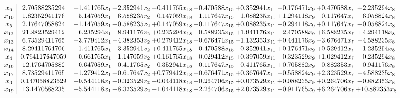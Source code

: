 \documentclass[10pt]{article}
\begin{document}
 \[\begin{array}{c| c c@{\hskip 2pt} c@{\hskip 2pt} c@{\hskip 2pt} c@{\hskip 2pt} c@{\hskip 2pt} c@{\hskip 2pt} c@{\hskip 2pt} c@{\hskip 2pt} }
 x_{6}   &  2.70588235294 & + 1.411765 x_{1} & + 2.352941 x_{2} & -0.411765 x_{18} & -0.470588 x_{15} & + 0.352941 x_{11} & -0.176471 x_{9} & + 0.470588 x_{7} & + 2.235294 x_{8}\\
 x_{10}   &  1.82352941176 & + 5.147059 x_{1} & -6.588235 x_{2} & -0.147059 x_{18} & + 1.117647 x_{15} & -1.088235 x_{11} & + 1.294118 x_{9} & -0.117647 x_{7} & -6.058824 x_{8}\\
 x_{5}   &  2.17647058824 & -1.147059 x_{1} & + 0.588235 x_{2} & + 0.147059 x_{18} & -0.117647 x_{15} & + 0.088235 x_{11} & -0.294118 x_{9} & + 0.117647 x_{7} & + 0.058824 x_{8}\\
 x_{12}   &  21.8823529412 & -6.235294 x_{1} & + 8.941176 x_{2} & + 0.235294 x_{18} & -0.588235 x_{15} & + 1.941176 x_{11} & -2.470588 x_{9} & + 6.588235 x_{7} & + 4.294118 x_{8}\\
 x_{13}   &  6.73529411765 & -3.779412 x_{1} & -4.382353 x_{2} & + 0.279412 x_{18} & + 0.676471 x_{15} & -1.132353 x_{11} & + 0.441176 x_{9} & -3.676471 x_{7} & -4.588235 x_{8}\\
 x_{14}   &  8.29411764706 & -1.411765 x_{1} & -3.352941 x_{2} & + 0.411765 x_{18} & + 0.470588 x_{15} & -0.352941 x_{11} & + 0.176471 x_{9} & + 0.529412 x_{7} & -1.235294 x_{8}\\
 x_{4}   &  0.794117647059 & -0.661765 x_{1} & + 1.147059 x_{2} & + 0.161765 x_{18} & -0.029412 x_{15} & + 0.397059 x_{11} & -0.323529 x_{9} & + 1.029412 x_{7} & -0.235294 x_{8}\\
 x_{16}   &  12.1764705882 & -0.647059 x_{1} & -0.411765 x_{2} & -0.352941 x_{18} & -0.117647 x_{15} & -0.411765 x_{11} & + 0.705882 x_{9} & -0.882353 x_{7} & -0.941176 x_{8}\\
 x_{17}   &  8.73529411765 & -1.279412 x_{1} & + 0.617647 x_{2} & + 0.779412 x_{18} & + 0.676471 x_{15} & + 0.367647 x_{11} & -0.558824 x_{9} & + 2.323529 x_{7} & -4.588235 x_{8}\\
 x_{3}   &  0.147058823529 & + 0.544118 x_{1} & + 0.323529 x_{2} & -0.044118 x_{18} & -0.264706 x_{15} & + 0.073529 x_{11} & + 0.088235 x_{9} & + 0.264706 x_{7} & + 0.882353 x_{8}\\
 x_{19}   &  13.1470588235 & + 5.544118 x_{1} & + 8.323529 x_{2} & -1.044118 x_{18} & -2.264706 x_{15} & + 2.073529 x_{11} & -0.911765 x_{9} & + 6.264706 x_{7} & + 10.882353 x_{8}\\

\end{array}\]
\end{document}
